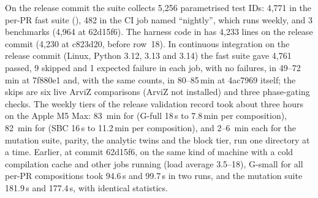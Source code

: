 On the release commit the suite collects 5,256 parametrised test IDs: 4,771 in the per-PR fast suite
(), 482 in the CI job named ``nightly'', which runs
weekly, and 3 benchmarks (4,964 at 62d15f6).
The harness code in  has 4,233 lines on the release commit (4,230 at
c823d20, before row~18).
In continuous integration on the release commit (Linux, Python 3.12, 3.13 and 3.14) the fast suite
gave 4,761 passed, 9 skipped and 1 expected failure in each job, with no failures, in 49--72\,min
at 7f880e1 and, with the same counts, in 80--85\,min at 4ac7969 itself;
the skips are six live ArviZ comparisons (ArviZ not installed) and three phase-gating checks.
The weekly tiers of the release validation record took about three hours on the Apple M5 Max:
83~min for  (G-full 18\,s to 7.8\,min per composition), 82~min for
 (SBC 16\,s to 11.2\,min per composition), and 2--6~min each for the mutation
suite, parity, the analytic twins and the block tier, run one directory at a time.
Earlier, at commit 62d15f6, on the same kind of machine with a cold compilation cache and other jobs
running (load average 3.5--18), G-small for all per-PR compositions took 94.6\,s and 99.7\,s in two
runs, and the mutation suite 181.9\,s and 177.4\,s, with identical statistics.

